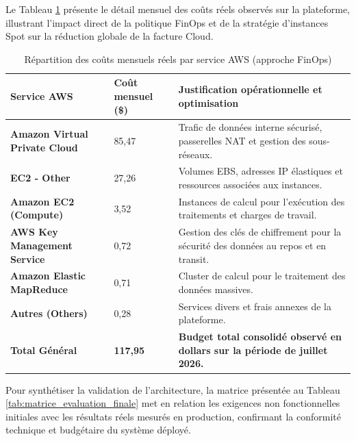 Le Tableau \ref{tab:repartition_couts_aws} présente le détail mensuel des coûts réels observés sur la plateforme, illustrant l'impact direct de la politique FinOps et de la stratégie d'instances Spot sur la réduction globale de la facture Cloud.

\begin{table}[H]
\centering
\caption{Répartition des coûts mensuels réels par service AWS (approche FinOps)}
\label{tab:repartition_couts_aws}
\renewcommand{\arraystretch}{1.4}
\begin{tabular}{|l|l|p{8cm}|}
\hline
\rowcolor{darkgreen!20} \textbf{Service AWS} & \textbf{Coût mensuel (\$)} & \textbf{Justification opérationnelle et optimisation} \\ \hline
\textbf{Amazon Virtual Private Cloud} & 85,47 & Trafic de données interne sécurisé, passerelles NAT et gestion des sous-réseaux. \\ \hline
\textbf{EC2 - Other} & 27,26 & Volumes EBS, adresses IP élastiques et ressources associées aux instances. \\ \hline
\textbf{Amazon EC2 (Compute)} & 3,52 & Instances de calcul pour l'exécution des traitements et charges de travail. \\ \hline
\textbf{AWS Key Management Service} & 0,72 & Gestion des clés de chiffrement pour la sécurité des données au repos et en transit. \\ \hline
\textbf{Amazon Elastic MapReduce} & 0,71 & Cluster de calcul pour le traitement des données massives. \\ \hline
\textbf{Autres (Others)} & 0,28 & Services divers et frais annexes de la plateforme. \\ \hline
\rowcolor{gray!10} \textbf{Total Général} & \textbf{117,95} & \textbf{Budget total consolidé observé en dollars sur la période de juillet 2026.} \\ \hline
\end{tabular}
\end{table}

Pour synthétiser la validation de l'architecture, la matrice présentée au Tableau \ref{tab:matrice_evaluation_finale} met en relation les exigences non fonctionnelles initiales avec les résultats réels mesurés en production, confirmant la conformité technique et budgétaire du système déployé.

